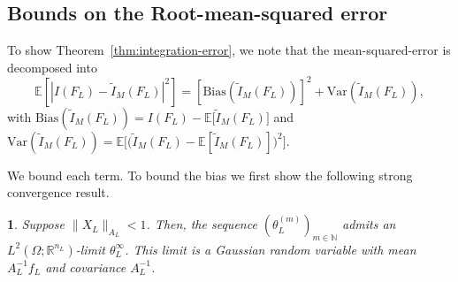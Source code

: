 \documentclass[11pt,english]{article}
\theoremstyle{plain}
\theoremstyle{plain}
\theoremstyle{plain}
\newtheorem{lem}[thm]{\protect\lemmaname}
\theoremstyle{plain}
\numberwithin{equation}{section}
\providecommand{\lemmaname}{Lemma}
\begin{document}
\subsection{Bounds on the Root-mean-squared error}\label{sec:proof_RMS_error}
To show Theorem~\ref{thm:integration-error}, we note that the mean-squared-error
is decomposed into
\begin{equation}
	\mathbb{E}[|I(F_{L})-\tilde{I}_{M}(F_{L})|^{2}]=[\mathrm{Bias}(\tilde{I}_{M}(F_{L}))]^{2}+\mathrm{Var}(\tilde{I}_{M}(F_{L})),\label{eq:MSE-decomp}
\end{equation}
with
$\mathrm{Bias}(\tilde{I}_{M}(F_{L}))  =I(F_{L})-\mathbb{E}\bigl[\tilde{I}_{M}(F_{L})\bigr]$ and $\mathrm{Var}(\tilde{I}_{M}(F_{L})) =\mathbb{E}\bigl[\bigl(\tilde{I}_{M}(F_{L})-\mathbb{E}[\tilde{I}_{M}(F_{L})]\bigr)^{2}\bigr]$.

We bound each term. To bound the bias we first show the following
strong convergence result.
\begin{lem}
	\label{lem:L2-limit}Suppose $\|X_{L}\|_{A_{L}}<1$. Then, the sequence
	$(\theta_{L}^{(m)})_{m\in\mathbb{N}}$ admits an  $L^{2}(\Omega;\mathbb{R}^{n_{L}})$-limit
	$\theta_{L}^{\infty}$. This limit is a Gaussian random variable with
	mean $A_{L}^{-1}f_{L}$ and covariance $A_{L}^{-1}$.
\end{lem}
\end{document}
